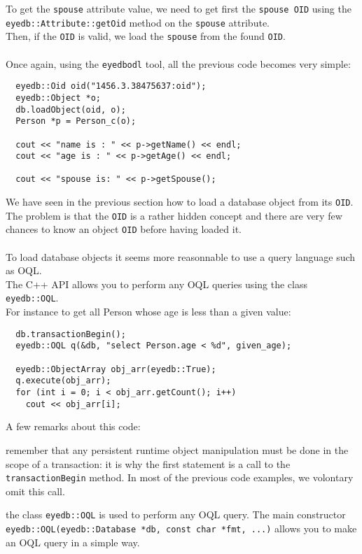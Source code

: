 \normalsize
To get the \texttt{spouse} attribute value, we need to get first the
\texttt{spouse OID} using the \texttt{eyedb::Attribute::getOid} method on
the \texttt{spouse} attribute.
\\
Then, if the \texttt{OID} is valid, we load the \texttt{spouse} from the
found \texttt{OID}.
\\
\\
Once again, using the \texttt{eyedbodl} tool, all the previous code
becomes very simple:
\verbsize
\begin{verbatim}
  eyedb::Oid oid("1456.3.38475637:oid");
  eyedb::Object *o;
  db.loadObject(oid, o);
  Person *p = Person_c(o);

  cout << "name is : " << p->getName() << endl;
  cout << "age is : " << p->getAge() << endl;

  cout << "spouse is: " << p->getSpouse();
\end{verbatim}
\normalsize
{}
We have seen in the previous section how to load a database object from its
\texttt{OID}. The problem is that the \texttt{OID} is a rather
hidden concept and there are very few chances to know an object \texttt{OID}
before having loaded it.
\\
\\
To load database objects it seems more reasonnable to use a query language
such as OQL.
\\
The \eyedb C++ API allows you to perform any OQL queries using the class
\texttt{eyedb::OQL}.
\\
For instance to get all Person whose age is less than a given value:
\verbsize
\begin{verbatim}
  db.transactionBegin();
  eyedb::OQL q(&db, "select Person.age < %

  eyedb::ObjectArray obj_arr(eyedb::True);
  q.execute(obj_arr);
  for (int i = 0; i < obj_arr.getCount(); i++)
    cout << obj_arr[i];
\end{verbatim}
\normalsize
A few remarks about this code:
\be
\item remember that any persistent runtime object manipulation must be done
in the scope of a transaction: it is why the first statement is a call
to the \texttt{transactionBegin} method. In most of the previous code examples,
we volontary omit this call.
\item the class \texttt{eyedb::OQL} is used to perform
any OQL query. The main constructor \texttt{eyedb::OQL(eyedb::Database *db, const char *fmt, ...)} allows you to make an OQL query in a simple way.
